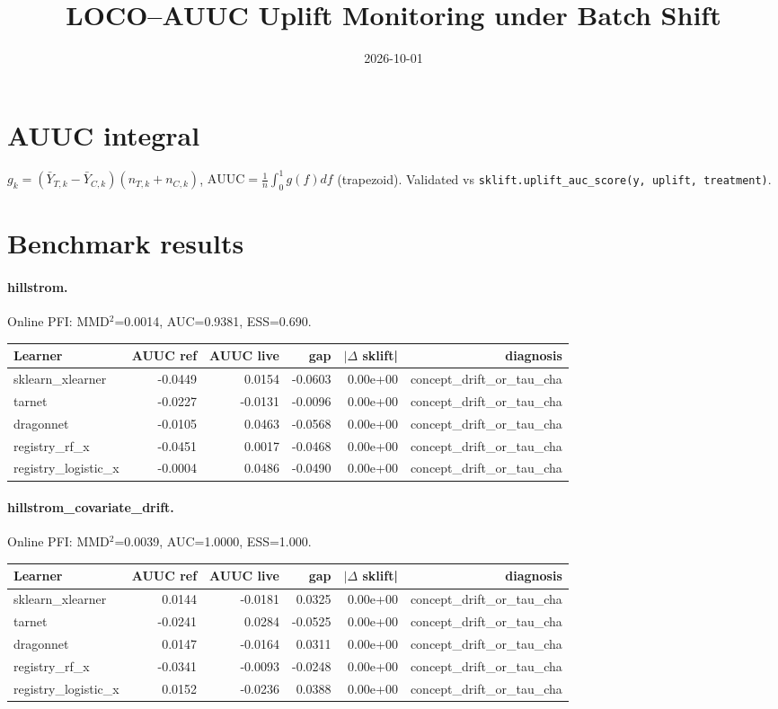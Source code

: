 \documentclass[11pt]{article}
\begin{document}
\title{LOCO--AUUC Uplift Monitoring under Batch Shift}
\date{2026-10-01}
\maketitle
\section{AUUC integral}
$g_k=(\bar Y_{T,k}-\bar Y_{C,k})(n_{T,k}+n_{C,k})$, $\mathrm{AUUC}=\frac{1}{n}\int_0^1 g(f)df$ (trapezoid). Validated vs \texttt{sklift.uplift\_auc\_score(y, uplift, treatment)}.
\section{Benchmark results}
\paragraph{hillstrom.} Online PFI: MMD$^2$=0.0014, AUC=0.9381, ESS=0.690.
\begin{tabular}{lrrrrr}
\toprule Learner & AUUC ref & AUUC live & gap & $|\Delta$ sklift| & diagnosis \\
\midrule
sklearn\_xlearner & -0.0449 & 0.0154 & -0.0603 & 0.00e+00 & concept_drift_or_tau_cha \\
tarnet & -0.0227 & -0.0131 & -0.0096 & 0.00e+00 & concept_drift_or_tau_cha \\
dragonnet & -0.0105 & 0.0463 & -0.0568 & 0.00e+00 & concept_drift_or_tau_cha \\
registry\_rf\_x & -0.0451 & 0.0017 & -0.0468 & 0.00e+00 & concept_drift_or_tau_cha \\
registry\_logistic\_x & -0.0004 & 0.0486 & -0.0490 & 0.00e+00 & concept_drift_or_tau_cha \\
\bottomrule\end{tabular}
\paragraph{hillstrom\_covariate\_drift.} Online PFI: MMD$^2$=0.0039, AUC=1.0000, ESS=1.000.
\begin{tabular}{lrrrrr}
\toprule Learner & AUUC ref & AUUC live & gap & $|\Delta$ sklift| & diagnosis \\
\midrule
sklearn\_xlearner & 0.0144 & -0.0181 & 0.0325 & 0.00e+00 & concept_drift_or_tau_cha \\
tarnet & -0.0241 & 0.0284 & -0.0525 & 0.00e+00 & concept_drift_or_tau_cha \\
dragonnet & 0.0147 & -0.0164 & 0.0311 & 0.00e+00 & concept_drift_or_tau_cha \\
registry\_rf\_x & -0.0341 & -0.0093 & -0.0248 & 0.00e+00 & concept_drift_or_tau_cha \\
registry\_logistic\_x & 0.0152 & -0.0236 & 0.0388 & 0.00e+00 & concept_drift_or_tau_cha \\
\bottomrule\end{tabular}
\end{document}
